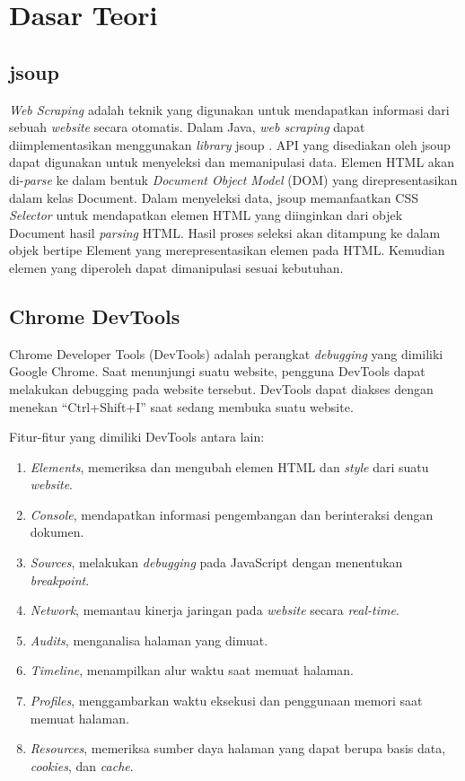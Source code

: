 \chapter{Dasar Teori}
\label{chap:Dasar Teori}

\section{jsoup}
\label{sec:jsoup}

\textit{Web Scraping} adalah teknik yang digunakan untuk mendapatkan informasi dari sebuah \textit{website}
secara otomatis. Dalam Java, \textit{web scraping} dapat diimplementasikan menggunakan \textit{library} jsoup \cite{jsoup}. API yang disediakan oleh jsoup dapat digunakan untuk menyeleksi dan memanipulasi data. Elemen HTML akan di-\textit{parse} ke dalam bentuk \textit{Document Object Model} (DOM) yang direpresentasikan dalam kelas Document. Dalam menyeleksi data, jsoup memanfaatkan CSS \textit{Selector} untuk mendapatkan elemen HTML yang diinginkan dari objek Document hasil \textit{parsing} HTML. Hasil proses seleksi akan ditampung ke dalam objek bertipe Element yang merepresentasikan elemen pada HTML. Kemudian elemen yang diperoleh dapat dimanipulasi sesuai kebutuhan.

\section{Chrome DevTools}
\label{sec:devtools}

Chrome Developer Tools (DevTools) \cite{devtools} adalah perangkat \textit{debugging} yang dimiliki Google Chrome. Saat menunjungi suatu website, pengguna DevTools dapat melakukan debugging pada website tersebut. DevTools dapat diakses dengan menekan "`Ctrl+Shift+I"' saat sedang membuka suatu website.  


Fitur-fitur yang dimiliki DevTools antara lain:
\begin{enumerate}
	\item \textit{Elements}, memeriksa dan mengubah elemen HTML dan \textit{style} dari suatu \textit{website}.
	\item \textit{Console}, mendapatkan informasi pengembangan dan berinteraksi dengan dokumen.
	\item \textit{Sources}, melakukan \textit{debugging} pada JavaScript dengan menentukan \textit{breakpoint}.
	\item \textit{Network}, memantau kinerja jaringan pada \textit{website} secara \textit{real-time}.
	\item \textit{Audits}, menganalisa halaman yang dimuat.
	\item \textit{Timeline}, menampilkan alur waktu saat memuat halaman.
	\item \textit{Profiles}, menggambarkan waktu eksekusi dan penggunaan memori saat memuat halaman.
	\item \textit{Resources}, memeriksa sumber daya halaman yang dapat berupa basis data, \textit{cookies}, dan \textit{cache}.
\end{enumerate}

